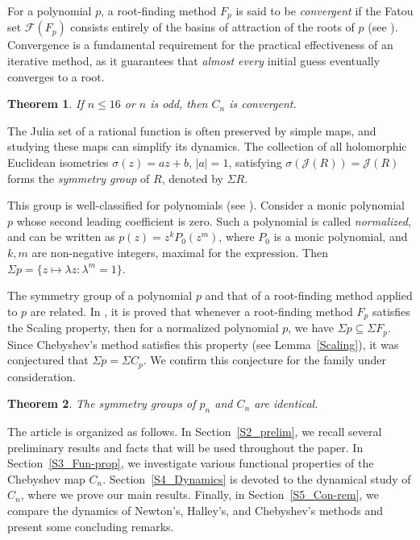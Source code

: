\documentclass[12pt]{article}
\newtheorem{maintheorem}{Theorem}
\begin{document}
For a polynomial $p$, a root-finding method $F_p$ is said to be \emph{convergent} if the Fatou set $\mathcal{F}(F_p)$ consists entirely of the basins of attraction of the roots of $p$ (see \cite{McMullen1987}). Convergence is a fundamental requirement for the practical effectiveness of an iterative method, as it guarantees that \emph{almost every} initial guess eventually converges to a root.

\begin{maintheorem}\label{Convergent}
	If $n\leq 16$ or $n$ is odd, then $C_n$ is convergent.
\end{maintheorem}

The Julia set of a rational function is often preserved by simple maps, and studying these maps can simplify its dynamics. The collection of all holomorphic Euclidean isometries $\sigma(z)=az+b$, $|a|=1$, satisfying $\sigma(\mathcal{J}(R))=\mathcal{J}(R)$ forms the \emph{symmetry group} of $R$, denoted by $\Sigma R$.

This group is well-classified for polynomials (see \cite[Theorem 9.5.4]{Beardon_book}). Consider a monic polynomial $p$ whose second leading coefficient is zero. Such a polynomial is called \emph{normalized}, and can be written as $p(z)=z^k P_0(z^m)$, where $P_0$ is a monic polynomial, and $k, m$ are non-negative integers, maximal for the expression. Then $\Sigma p=\{z\mapsto \lambda z: \lambda^m =1\}.$   

The symmetry group of a polynomial $p$ and that of a root-finding method applied to $p$ are related. In \cite{Sym_dyn}, it is proved that whenever a root-finding method $F_p$ satisfies the Scaling property, then for a normalized polynomial $p$, we have $\Sigma p\subseteq \Sigma F_p$. Since Chebyshev's method satisfies this property (see Lemma~\ref{Scaling}), it was conjectured that $\Sigma p=\Sigma C_p$. We confirm this conjecture for the family under consideration.
\begin{maintheorem}\label{Equal_sym}
	The symmetry groups of $p_n$ and $C_n$ are identical.
\end{maintheorem}

The article is organized as follows. In Section~\ref{S2_prelim}, we recall several preliminary  results and facts that will be used throughout the paper. In Section~\ref{S3_Fun-prop}, we investigate various functional properties of the Chebyshev map $C_n$. Section~\ref{S4_Dynamics} is devoted to the dynamical study of $C_n$, where we prove our main results. Finally, in Section~\ref{S5_Con-rem}, we compare the dynamics of Newton's, Halley's, and Chebyshev's methods and present some concluding remarks.
\end{document}
